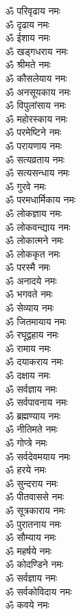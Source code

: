 \begin{multicols}{2}
\begin{flushleft}
ॐ परिवृढाय नमः\\
ॐ दृढाय नमः\\
ॐ ईशाय नमः\\
ॐ खड्गधराय नमः\\
ॐ श्रीमते नमः\\
ॐ कौसलेयाय नमः\\
ॐ अनसूयकाय नमः\\
ॐ विपुलांसाय नमः\\
ॐ महोरस्काय नमः\\
ॐ परमेष्टिने नमः\hfill{}\\
ॐ परायणाय नमः\\
ॐ सत्यव्रताय नमः\\
ॐ सत्यसन्धाय नमः\\
ॐ गुरवे नमः\\
ॐ परमधार्मिकाय नमः\\
ॐ लोकज्ञाय नमः\\
ॐ लोकवन्द्याय नमः\\
ॐ लोकात्मने नमः\\
ॐ लोककृत नमः\\
ॐ परस्मै नमः\hfill{}\\
ॐ अनादये नमः\\
ॐ भगवते नमः\\
ॐ सेव्याय नमः\\
ॐ जितमायाय नमः\\
ॐ रघूद्वहाय नमः\\
ॐ रामाय नमः\\
ॐ दयाकराय नमः\\
ॐ दक्षाय नमः\\
ॐ सर्वज्ञाय नमः\\
ॐ सर्वपावनाय नमः\hfill{}\\
ॐ ब्रह्मण्याय नमः\\
ॐ नीतिमते नमः\\
ॐ गोप्त्रे नमः\\
ॐ सर्वदेवमयाय नमः\\
ॐ हरये नमः\\
ॐ सुन्दराय नमः\\
ॐ पीतवाससे नमः\\
ॐ सूत्रकाराय नमः\\
ॐ पुरातनाय नमः\\
ॐ सौम्याय नमः\hfill{}\\
ॐ महर्षये नमः\\
ॐ कोदण्डिने नमः\\
ॐ सर्वज्ञाय नमः\\
ॐ सर्वकोविदाय नमः\\
ॐ कवये नमः\\

\end{flushleft}
\end{multicols}
